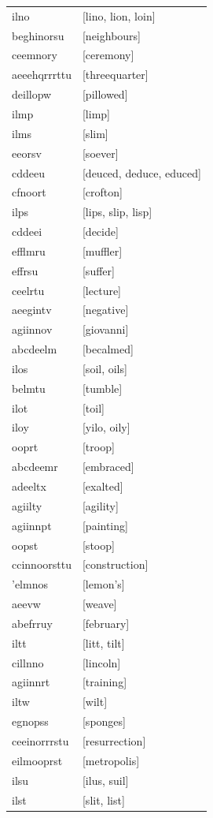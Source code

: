 \documentclass{article}
\begin{document}
\begin{tabular}{ll}
ilno & [lino, lion, loin] \\
beghinorsu & [neighbours] \\
ceemnory & [ceremony] \\
aeeehqrrrttu & [threequarter] \\
deillopw & [pillowed] \\
ilmp & [limp] \\
ilms & [slim] \\
eeorsv & [soever] \\
cddeeu & [deuced, deduce, educed] \\
cfnoort & [crofton] \\
ilps & [lips, slip, lisp] \\
cddeei & [decide] \\
efflmru & [muffler] \\
effrsu & [suffer] \\
ceelrtu & [lecture] \\
aeegintv & [negative] \\
agiinnov & [giovanni] \\
abcdeelm & [becalmed] \\
ilos & [soil, oils] \\
belmtu & [tumble] \\
ilot & [toil] \\
iloy & [yilo, oily] \\
ooprt & [troop] \\
abcdeemr & [embraced] \\
adeeltx & [exalted] \\
agiilty & [agility] \\
agiinnpt & [painting] \\
oopst & [stoop] \\
ccinnoorsttu & [construction] \\
'elmnos & [lemon's] \\
aeevw & [weave] \\
abefrruy & [february] \\
iltt & [litt, tilt] \\
cillnno & [lincoln] \\
agiinnrt & [training] \\
iltw & [wilt] \\
egnopss & [sponges] \\
ceeinorrrstu & [resurrection] \\
eilmooprst & [metropolis] \\
ilsu & [ilus, suil] \\
ilst & [slit, list] \\

\end{tabular}
\end{document}
